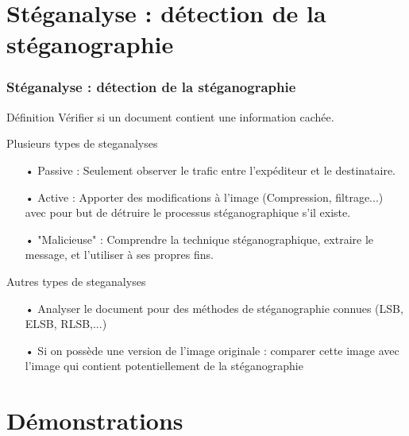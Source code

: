 \documentclass{beamer}
\begin{document}
\section{Stéganalyse : détection de la stéganographie}
\begin{frame}
\frametitle{Stéganalyse : détection de la stéganographie}

\begin{block}{Définition}
Vérifier si un document contient une information cachée.
\end{block}

\begin{block}{Plusieurs types de steganalyses}
\begin{itemize}
    \item[•] Passive : Seulement observer le trafic entre l'expéditeur et le destinataire.
    \item[•] Active : Apporter des modifications à l'image
(Compression, filtrage...) avec pour but de détruire le processus stéganographique s’il existe.
    \item[•] "Malicieuse" : Comprendre la technique stéganographique, extraire le message, et l'utiliser à ses propres fins.
\end{itemize}
\end{block}

\begin{block}{Autres types de steganalyses}
\begin{itemize}
    \item[•] Analyser le document pour des méthodes de stéganographie connues (LSB, ELSB, RLSB,...)
    \item[•] Si on possède une version de l'image originale : comparer cette image avec l'image qui contient potentiellement de la stéganographie
\end{itemize}
\end{block}
\end{frame}

\section{Démonstrations}
\end{document}
